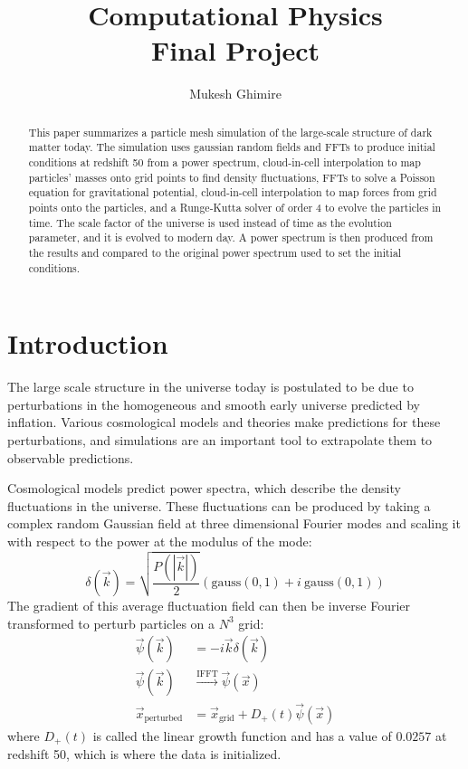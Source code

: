 \documentclass[12pt]{article}   	%
\title{Computational Physics\\Final Project}
\author{Mukesh Ghimire}
\date{}							%
\begin{document}
\maketitle
\begin{abstract}
	This paper summarizes a particle mesh simulation of the large-scale structure of dark matter today.
	The simulation uses gaussian random fields and FFTs to produce initial conditions at redshift 50
	from a power spectrum, cloud-in-cell interpolation to map particles' masses onto grid points to
	find density fluctuations, FFTs to solve a Poisson equation for gravitational potential, cloud-in-cell
	interpolation to map forces from grid points onto the particles, and a Runge-Kutta solver of order 4
	to evolve the particles in time. The scale factor of the universe is used instead of time as the
	evolution parameter, and it is evolved to modern day. A power spectrum is then produced from
	the results and compared to the original power spectrum used to set the initial conditions.
\end{abstract}

\section*{Introduction}
The large scale structure in the universe today is postulated to be due to perturbations in the 
homogeneous and smooth early universe predicted by inflation. Various cosmological models and
theories make predictions for these perturbations, and simulations are an important tool to extrapolate
them to observable predictions.

Cosmological models predict power spectra, which describe the density fluctuations in the universe.
These fluctuations can be produced by taking a complex random Gaussian field at three dimensional
Fourier modes and scaling it with respect to the power at the modulus of the mode:
\begin{equation}
	\delta(\vec k) = \sqrt{\frac{P(|\vec k|)}{2}}(\text{gauss}(0,1) + i\ \text{gauss}(0,1))
\end{equation}
The gradient of this average fluctuation field can then be inverse Fourier transformed to perturb 
particles on a $N^3$ grid:
\begin{align}
	\vec \psi(\vec k) &= -i\vec k \delta(\vec k)\\
	\vec\psi(\vec k) &\overset{\text{IFFT}}{\to}\vec \psi(\vec x) \nonumber \\
	\vec x_{\text{perturbed}} &= \vec x_{\text{grid}} + D_+(t)\vec \psi(\vec x)
\end{align}
where $D_+(t)$ is called the linear growth function and has a value of $0.0257$ at redshift 50, which
is where the data is initialized.
\end{document}
